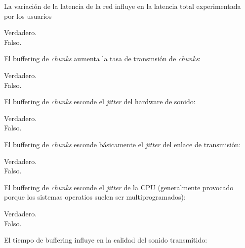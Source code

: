 \documentclass[legalpaper, 12pt, addpoints]{exam}
\begin{document}
\begin{questions}
\vspace{0.10in}

\question La variación de la latencia de la red influye en la latencia total experimentada por los usuarios

\begin{oneparchoices}
  \choice Verdadero.\\
  \choice Falso.
\end{oneparchoices}
  
\vspace{0.10in}

\question El buffering de \emph{chunks} aumenta la tasa de transmsión de \emph{chunks}:

\begin{oneparchoices}
  \choice Verdadero.\\
  \choice Falso.
\end{oneparchoices}
  
\vspace{0.10in}

\question El buffering de \emph{chunks} esconde el \emph{jitter} del hardware de sonido:

\begin{oneparchoices}
  \choice Verdadero.\\
  \choice Falso.
\end{oneparchoices}
  
\vspace{0.10in}

\question El buffering de \emph{chunks} esconde básicamente el \emph{jitter} del enlace de transmisión:

\begin{oneparchoices}
  \choice Verdadero.\\
  \choice Falso.
\end{oneparchoices}
  
\vspace{0.10in}

\question El buffering de \emph{chunks} esconde el \emph{jitter} de la CPU
(generalmente provocado porque los sistemas operatios suelen ser
multiprogramados):

\begin{oneparchoices}
  \choice Verdadero.\\
  \choice Falso.
\end{oneparchoices}
  
\vspace{0.10in}

\question El tiempo de buffering influye en la calidad del sonido transmitido:


\end{questions}
\end{document}
